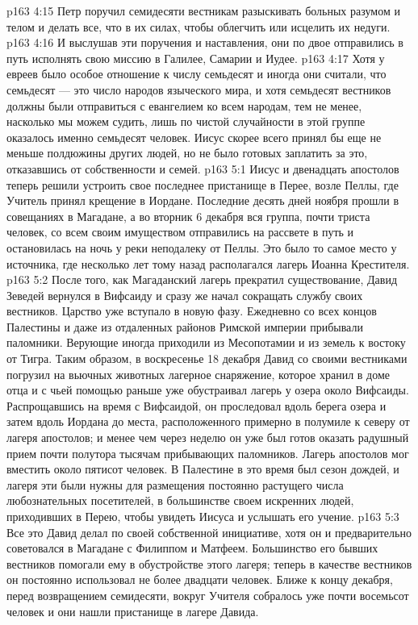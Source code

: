\vs p163 4:15 \pc {}\bibnobreakspace {} Петр поручил семидесяти вестникам разыскивать больных разумом и телом и делать все, что в их силах, чтобы облегчить или исцелить их недуги.
\vs p163 4:16 \pc И выслушав эти поручения и наставления, они по двое отправились в путь исполнять свою миссию в Галилее, Самарии и Иудее.
\vs p163 4:17 Хотя у евреев было особое отношение к числу семьдесят и иногда они считали, что семьдесят --- это число народов языческого мира, и хотя семьдесят вестников должны были отправиться с евангелием ко всем народам, тем не менее, насколько мы можем судить, лишь по чистой случайности в этой группе оказалось именно семьдесят человек. Иисус скорее всего принял бы еще не меньше полдюжины других людей, но не было готовых заплатить за это, отказавшись от собственности и семей.
\vs p163 5:1 Иисус и двенадцать апостолов теперь решили устроить свое последнее пристанище в Перее, возле Пеллы, где Учитель принял крещение в Иордане. Последние десять дней ноября прошли в совещаниях в Магадане, а во вторник 6 декабря вся группа, почти триста человек, со всем своим имуществом отправились на рассвете в путь и остановилась на ночь у реки неподалеку от Пеллы. Это было то самое место у источника, где несколько лет тому назад располагался лагерь Иоанна Крестителя.
\vs p163 5:2 После того, как Магаданский лагерь прекратил существование, Давид Зеведей вернулся в Вифсаиду и сразу же начал сокращать службу своих вестников. Царство уже вступало в новую фазу. Ежедневно со всех концов Палестины и даже из отдаленных районов Римской империи прибывали паломники. Верующие иногда приходили из Месопотамии и из земель к востоку от Тигра. Таким образом, в воскресенье 18 декабря Давид со своими вестниками погрузил на вьючных животных лагерное снаряжение, которое хранил в доме отца и с чьей помощью раньше уже обустраивал лагерь у озера около Вифсаиды. Распрощавшись на время с Вифсаидой, он проследовал вдоль берега озера и затем вдоль Иордана до места, расположенного примерно в полумиле к северу от лагеря апостолов; и менее чем через неделю он уже был готов оказать радушный прием почти полутора тысячам прибывающих паломников. Лагерь апостолов мог вместить около пятисот человек. В Палестине в это время был сезон дождей, и лагеря эти были нужны для размещения постоянно растущего числа любознательных посетителей, в большинстве своем искренних людей, приходивших в Перею, чтобы увидеть Иисуса и услышать его учение.
\vs p163 5:3 Все это Давид делал по своей собственной инициативе, хотя он и предварительно советовался в Магадане с Филиппом и Матфеем. Большинство его бывших вестников помогали ему в обустройстве этого лагеря; теперь в качестве вестников он постоянно использовал не более двадцати человек. Ближе к концу декабря, перед возвращением семидесяти, вокруг Учителя собралось уже почти восемьсот человек и они нашли пристанище в лагере Давида.
